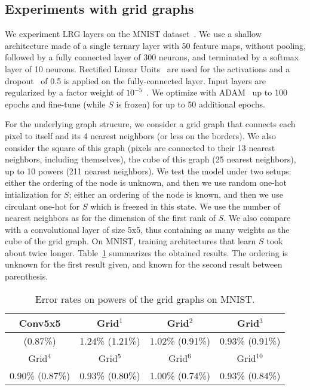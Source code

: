 \subsection{Experiments with grid graphs}

We experiment LRG layers on the MNIST dataset~\citep{lecun1998mnist}. We use a shallow architecture made of a single ternary layer with 50 feature maps, without pooling, followed by a fully connected layer of 300 neurons, and terminated by a softmax layer of 10 neurons. Rectified Linear Units~\cite{glorot2011deep} are used for the activations and a dropout~\cite{srivastava2014dropout} of 0.5 is applied on the fully-connected layer. Input layers are regularized by a factor weight of $10^{-5}$~\cite{ng2004feature}. We optimize with ADAM~\cite{kingma2014adam} up to 100 epochs and fine-tune (while $S$ is frozen) for up to 50 additional epochs.

For the underlying graph strucure, we consider a grid graph that connects each pixel to itself and its 4 nearest neighbors (or less on the borders). We also consider the square of this graph (pixels are connected to their 13 nearest neighbors, including themselves), the cube of this graph (25 nearest neighbors), up to 10 powers (211 nearest neighbors).
We test the model under two setups: either the ordering of the node is unknown, and then we use random one-hot intialization for $S$; either an ordering of the node is known, and then we use circulant one-hot for $S$ which is freezed in this state. We use the number of nearest neighbors as for the dimension of the first rank of $S$.
We also compare with a convolutional layer of size 5x5, thus containing as many weights as the cube of the grid graph. On MNIST, training architectures that learn $S$ took about twice longer. Table~\ref{toy} summarizes the obtained results. The ordering is unknown for the first result given, and known for the second result between parenthesis.

\begin{table}[H]
  \caption{Error rates on powers of the grid graphs on MNIST.}
  \begin{center}
    \bgroup
    \def\arraystretch{1.5}%
    \begin{tabular}{|c|c|c|c|}
      \hline
      Conv5x5 & Grid$^1$ & Grid$^2$ & Grid$^3$\\
      \hline
      (0.87\%) & 1.24\% (1.21\%) & 1.02\% (0.91\%) & 0.93\% (0.91\%)\\
      \hline
      \hline
      Grid$^4$ & Grid$^5$ & Grid$^6$ & Grid$^{10}$\\
      \hline
      0.90\% (0.87\%) & 0.93\% (0.80\%) & 1.00\% (0.74\%) & 0.93\% (0.84\%)\\
      \hline
    \end{tabular}
    \egroup
  \end{center}
  \label{toy}
\end{table}


